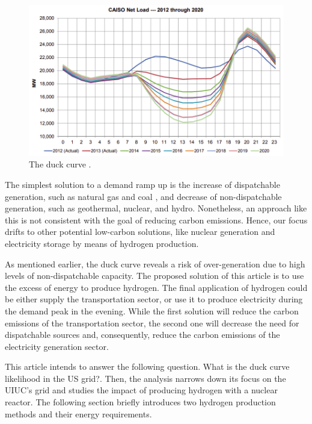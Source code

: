 \documentclass{anstrans}
\begin{document}
\begin{figure}[htbp!]
	\centering
	\includegraphics[width=1.0\linewidth]{figures/caiso-duck.png}
	\hfill
	\caption{The duck curve \cite{bouillon_prepared_2014}.}
	\label{fig:duck}
\end{figure}

The simplest solution to a demand ramp up is the increase of dispatchable generation, such as natural gas and coal \cite{bouillon_prepared_2014}, and decrease of non-dispatchable generation, such as geothermal, nuclear, and hydro.
Nonetheless, an approach like this is not consistent with the goal of reducing carbon emissions.
Hence, our focus drifts to other potential low-carbon solutions, like nuclear generation and electricity storage by means of hydrogen production.

As mentioned earlier, the duck curve reveals a risk of over-generation due to high levels of non-dispatchable capacity.
The proposed solution of this article is to use the excess of energy to produce hydrogen.
The final application of hydrogen could be either supply the transportation sector, or use it to produce electricity during the demand peak in the evening.
While the first solution will reduce the carbon emissions of the transportation sector, the second one will decrease the need for dispatchable sources and, consequently, reduce the carbon emissions of the electricity generation sector.

This article intends to answer the following question. What is the duck curve likelihood in the \gls{US} grid?.
Then, the analysis narrows down its focus on the \gls{UIUC}'s grid and studies the impact of producing hydrogen with a nuclear reactor.
The following section briefly introduces two hydrogen production methods and their energy requirements.
\end{document}
